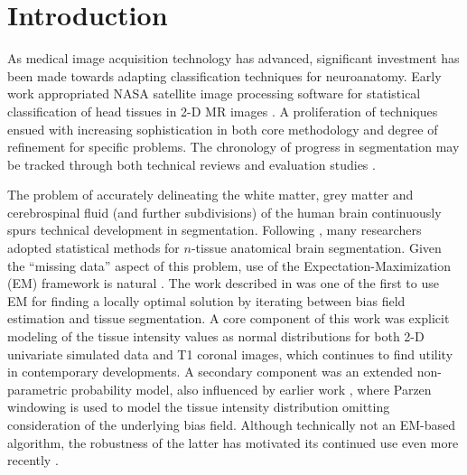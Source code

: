 \documentclass[11pt,english]{article}
\begin{document}

\clearpage

\section{Introduction} As medical image acquisition technology has advanced,
significant investment has been made towards adapting classification
techniques for neuroanatomy.  Early work appropriated NASA
satellite image processing software for statistical classification of
head tissues in 2-D MR images \citep{Vannier1985}.  A proliferation of
techniques ensued with increasing sophistication in both core
methodology and degree of refinement for specific problems.  The
chronology of progress in segmentation may be tracked through both
technical reviews
\citep{Bezdek1993,Pal1993,Clarke1995,Pham2000,Viergever2001,Suri2002,Duncan2004,Balafar2010}
and evaluation studies
\citep[e.g.][]{Cuadra2005,Zaidi2006,Klauschen2009,Boer2010}.

The problem of accurately delineating the white matter, grey matter
and cerebrospinal fluid (and further subdivisions) of the human brain continuously spurs
technical development in segmentation.  Following \cite{Vannier1985},
many researchers adopted statistical methods for $n$-tissue anatomical
brain segmentation.  Given the ``missing data'' aspect of this
problem, use of the Expectation-Maximization (EM) framework is natural \citep{Dempster1977}.  The
work described in \cite{Wells1996} was one of the first to use EM for
finding a locally optimal solution by iterating between bias field
estimation and tissue segmentation.  A core component of this work was
explicit modeling of the tissue intensity values as normal
distributions \citep{Cline1990} for both 2-D univariate simulated data
and T1 coronal images, which continues to find utility in contemporary
developments.  A secondary component was an extended non-parametric
probability model, also influenced by earlier work \citep{Kikinis1992}, where
Parzen windowing is used to model the tissue intensity distribution
omitting consideration of the underlying bias field.  Although
technically not an EM-based algorithm, the robustness of the latter has motivated its continued use even more recently \citep[e.g.][]{Weisenfeld2009}.
\end{document}
